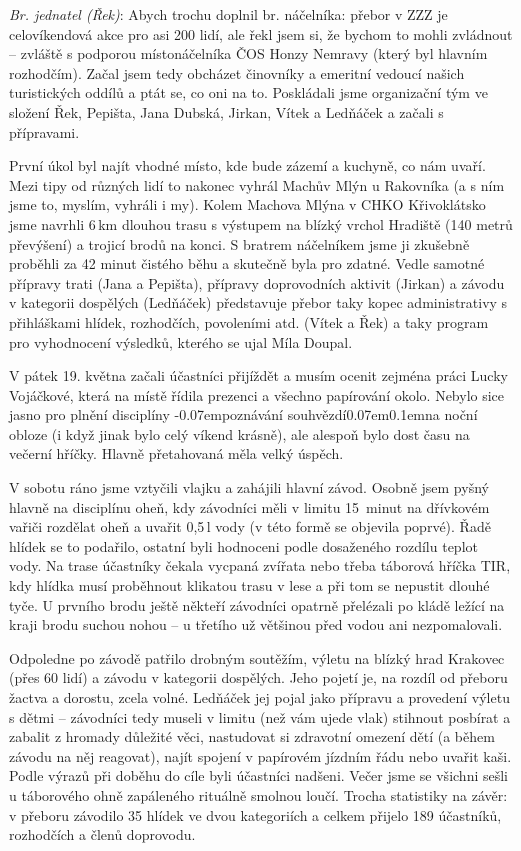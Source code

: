 \documentclass[11pt]{article}
\newcommand{\luv}{\clqq\kern-0.07em}
\newcommand{\ruv}{\kern0.07em\crqq\kern0.1em}
\begin{document}
\textit{Br. jednatel (Řek)}: Abych trochu doplnil br. náčelníka: přebor v ZZZ je celovíkendová akce pro asi 200 lidí, ale řekl jsem si, že bychom to mohli zvládnout – zvláště s podporou místonáčelníka ČOS Honzy Nemravy (který byl hlavním rozhodčím). Začal jsem tedy obcházet činovníky a emeritní vedoucí našich turistických oddílů a ptát se, co oni na to. Poskládali jsme organizační tým ve složení Řek, Pepišta, Jana Dubská, Jirkan, Vítek a Ledňáček a začali s přípravami. 


První úkol byl najít vhodné místo, kde bude zázemí a kuchyně, co nám uvaří. Mezi tipy od různých lidí to nakonec vyhrál Machův Mlýn u Rakovníka (a s ním jsme to, myslím, vyhráli i my). Kolem Machova Mlýna v CHKO Křivoklátsko jsme navrhli 6\,km dlouhou trasu s výstupem na blízký vrchol Hradiště (140 metrů převýšení) a trojicí brodů na konci. S bratrem náčelníkem jsme ji zkušebně proběhli za 42 minut čistého běhu a skutečně byla pro zdatné. Vedle samotné přípravy trati (Jana a Pepišta), přípravy doprovodních aktivit (Jirkan) a závodu v kategorii dospělých (Ledňáček) představuje přebor taky kopec administrativy s přihláškami hlídek, rozhodčích, povoleními atd. (Vítek a Řek) a taky program pro vyhodnocení výsledků, kterého se ujal Míla Doupal. 


V pátek 19. května začali účastníci přijíždět a musím ocenit zejména práci Lucky Vojáčkové, která na místě řídila prezenci a všechno papírování okolo. Nebylo sice jasno pro plnění disciplíny \luv poznávání souhvězdí\ruv na noční obloze (i když jinak bylo celý víkend krásně), ale alespoň bylo dost času na večerní hříčky. Hlavně přetahovaná měla velký úspěch. 


V sobotu ráno jsme vztyčili vlajku a zahájili hlavní závod. Osobně jsem pyšný hlavně na disciplínu oheň, kdy závodníci měli v limitu 15~minut na dřívkovém vařiči rozdělat oheň a uvařit 0,5\,l vody (v této formě se objevila poprvé). Řadě hlídek se to podařilo, ostatní byli hodnoceni podle dosaženého rozdílu teplot vody. Na trase účastníky čekala vycpaná zvířata nebo třeba táborová hříčka TIR, kdy hlídka musí proběhnout klikatou trasu v lese a při tom se nepustit dlouhé tyče. U prvního brodu ještě někteří závodníci opatrně přelézali po kládě ležící na kraji brodu suchou nohou – u třetího už většinou před vodou ani nezpomalovali. 


Odpoledne po závodě patřilo drobným soutěžím, výletu na blízký hrad Krakovec (přes 60 lidí) a závodu v kategorii dospělých. Jeho pojetí je, na rozdíl od přeboru žactva a dorostu, zcela volné. Ledňáček jej pojal jako přípravu a provedení výletu s dětmi – závodníci tedy museli v limitu (než vám ujede vlak) stihnout posbírat a zabalit z hromady důležité věci, nastudovat si zdravotní omezení dětí (a během závodu na něj reagovat), najít spojení v papírovém jízdním řádu nebo uvařit kaši. Podle výrazů při doběhu do cíle byli účastníci nadšeni. Večer jsme se všichni sešli u táborového ohně zapáleného rituálně smolnou loučí. 
Trocha statistiky na závěr: v přeboru závodilo 35 hlídek ve dvou kategoriích a celkem přijelo 189 účastníků, rozhodčích a členů doprovodu. 
\end{document}
